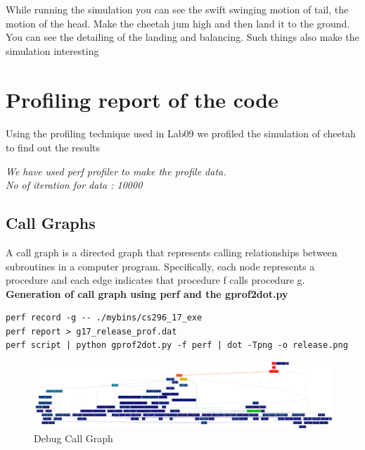 \documentclass[11pt]{article}
\begin{document}
While running the simulation you can see the swift swinging motion of tail, the motion of the head. Make the cheetah jum high and then land it to the ground. You can see the detailing of the landing and balancing. Such things also make the simulation interesting
\section{Profiling report of the code }
\paragraph{}
Using the profiling technique used in Lab09 we profiled the simulation of cheetah to find out the results
 
 \emph{We have used perf profiler to make the profile data.}\\
 \emph{No of iteration for data : 10000}

\subsection{Call Graphs}
A call graph is a directed graph that represents calling relationships between subroutines in a computer program.
Specifically, each node represents a procedure and each edge indicates that procedure f calls procedure g.\\

\textbf{Generation of call graph using perf and the gprof2dot.py} \\
\begin{lstlisting}
perf record -g -- ./mybins/cs296_17_exe
perf report > g17_release_prof.dat
perf script | python gprof2dot.py -f perf | dot -Tpng -o release.png
\end{lstlisting}

\begin{figure}[h!]
	\centering	
		\includegraphics[width=1\textwidth]{debug.png}
		\caption{Debug Call Graph}
\end{figure}
\end{document}
